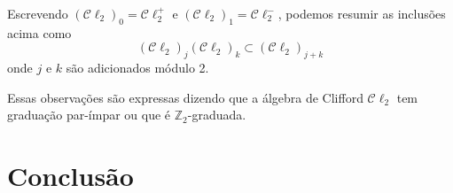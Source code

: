\documentclass[12pt, oneside, a4paper, english, brazil]{abntex2}
\providecommand{\p}[1]{\left( #1 \right)}
\providecommand{\Cldois}{\mathcal{C}\ell_2}
\providecommand{\Cldoispar}{\mathcal{C}\ell_2^{+}}
\providecommand{\Cldoisimpar}{\mathcal{C}\ell_2^{-}}
\theoremstyle{normal}
\theoremstyle{observacao}
\begin{document}
Escrevendo $\p{\Cldois}_0 = \Cldoispar$ e $\p{\Cldois}_1 = \Cldoisimpar$, podemos resumir as inclusões acima como 
\[
\p{\Cldois}_j\p{\Cldois}_k \subset \p{\Cldois}_{j+k}
\]
onde $j$ e $k$ são adicionados módulo 2.

Essas observações são expressas dizendo que a álgebra de Clifford $\Cldois$ tem graduação par-ímpar ou que é $\mathbb{Z}_2$-graduada.
% 

\chapter{Conclusão}


\postextual





%


%
%
%

\end{document}
